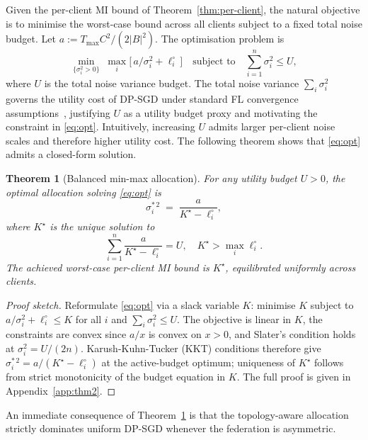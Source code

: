 \documentclass[letterpaper,journal]{IEEEtran}
\newtheorem{theorem}{Theorem}[section]
\begin{document}
Given the per-client MI bound of Theorem~\ref{thm:per-client}, the
natural objective is to minimise the worst-case bound across all
clients subject to a fixed total noise budget. Let
$a := T_{\max} C^2 / (2|B|^2)$. The optimisation problem is
\begin{equation}
\min_{\{\sigma_i^2 > 0\}}\; \max_i \big[\, a / \sigma_i^2 +
\ell_i^\circ\, \big]
\quad \text{subject to} \quad
\sum_{i=1}^n \sigma_i^2 \leq U,
\label{eq:opt}
\end{equation}
where $U$ is the total noise variance budget. The total noise
variance $\sum_i \sigma_i^2$ governs the utility cost of DP-SGD
under standard FL convergence
assumptions~\cite{wei2020nbafl},
justifying $U$ as a utility budget proxy and motivating the
constraint in \eqref{eq:opt}. Intuitively, increasing $U$ admits
larger per-client noise scales and therefore higher utility cost.
The following theorem shows that \eqref{eq:opt} admits a closed-form
solution.

\begin{theorem}[Balanced min-max allocation]
\label{thm:allocation}
For any utility budget $U > 0$, the optimal allocation solving
\eqref{eq:opt} is
\begin{equation}
\sigma_i^{*\,2} \;=\; \frac{a}{K^\star - \ell_i^\circ},
\label{eq:sigma-star}
\end{equation}
where $K^\star$ is the unique solution to
\begin{equation}
\sum_{i=1}^n \frac{a}{K^\star - \ell_i^\circ} = U,
\quad
K^\star > \max_i \ell_i^\circ.
\label{eq:budget-eq}
\end{equation}
The achieved worst-case per-client MI bound is $K^\star$,
equilibrated uniformly across clients.
\end{theorem}

\begin{proof}[Proof sketch]
Reformulate \eqref{eq:opt} via a slack variable $K$: minimise $K$
subject to $a/\sigma_i^2 + \ell_i^\circ \leq K$ for all $i$ and
$\sum_i \sigma_i^2 \leq U$. The objective is linear in $K$, the
constraints are convex since $a/x$ is convex on $x > 0$, and
Slater's condition holds at $\sigma_i^2 = U/(2n)$. Karush-Kuhn-Tucker (KKT) conditions therefore give
$\sigma_i^{*\,2} = a/(K^\star - \ell_i^\circ)$ at the active-budget
optimum; uniqueness of $K^\star$ follows from
strict monotonicity of the budget equation in $K$. The full proof
is given in Appendix~\ref{app:thm2}.
\end{proof}

An immediate consequence of Theorem~\ref{thm:allocation} is that the topology-aware allocation strictly dominates uniform DP-SGD whenever the federation is asymmetric.
\end{document}
